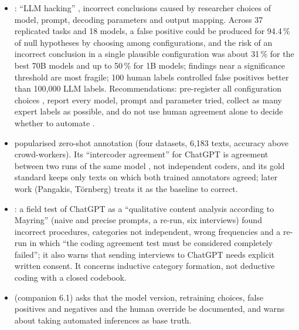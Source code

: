 \begin{itemize}
\item {}: ``LLM hacking'' , incorrect conclusions caused by researcher choices of model, prompt, decoding parameters and output mapping. Across 37 replicated tasks and 18 models, a false positive could be produced for 94.4\,\% of null hypotheses by choosing among configurations, and the risk of an incorrect conclusion in a single plausible configuration was about 31\,\% for the best 70B models and up to 50\,\% for 1B models; findings near a significance threshold are most fragile; 100 human labels controlled false positives better than 100{,}000 LLM labels. Recommendations: pre-register all configuration choices , report every model, prompt and parameter tried, collect as many expert labels as possible, and do not use human agreement alone to decide whether to automate .
\item {} popularised zero-shot annotation (four datasets, 6{,}183 texts, accuracy above crowd-workers). Its ``intercoder agreement'' for ChatGPT is agreement between two runs of the same model , not independent coders, and its gold standard keeps only texts on which both trained annotators agreed; later work (Pangakis, Törnberg) treats it as the baseline to correct.
\item {}: a field test of ChatGPT as a ``qualitative content analysis according to Mayring'' (naive and precise prompts, a re-run, six interviews) found incorrect procedures, categories not independent, wrong frequencies and a re-run in which ``the coding agreement test must be considered completely failed''; it also warns that sending interviews to ChatGPT needs explicit written consent. It concerns inductive category formation, not deductive coding with a closed codebook.
\item {} (companion 6.1) asks that the model version, retraining choices, false positives and negatives and the human override be documented, and warns about taking automated inferences as base truth.
\end{itemize}

